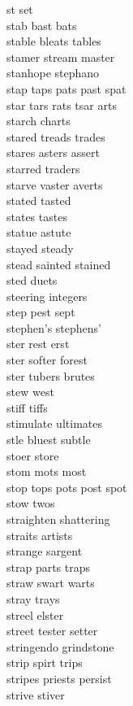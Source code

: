 st set \\
stab bast bats\\
stable bleats tables\\
stamer stream master\\
stanhope stephano\\
stap taps pats past spat\\
star tars rats tsar arts\\
starch charts\\
stared treads trades\\
stares asters assert\\
starred traders\\
starve vaster averts\\
stated tasted\\
states tastes\\
statue astute\\
stayed steady\\
stead sainted stained  \\
sted duets \\
steering integers\\
step pest sept\\
stephen's stephens'\\
ster rest erst\\
ster softer forest  \\
ster tubers brutes  \\
stew west\\
stiff tiffs\\
stimulate ultimates\\
stle bluest subtle  \\
stoer store\\
stom mots most\\
stop tops pots post spot\\
stow twos\\
straighten shattering\\
straits artists\\
strange sargent\\
strap parts traps\\
straw swart warts\\
stray trays\\
streel elster\\
street tester setter\\
stringendo grindstone\\
strip spirt trips\\
stripes priests persist\\
strive stiver\\
